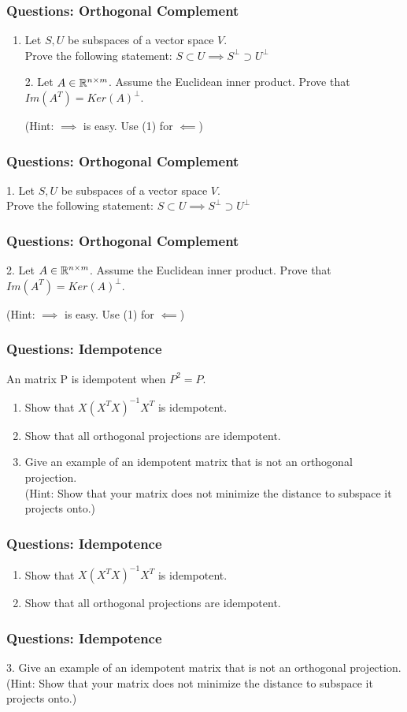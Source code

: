 \documentclass{beamer}
\begin{document}
\begin{frame}[t]
\frametitle{Questions: Orthogonal Complement}
\begin{enumerate}
\item Let $S, U$ be subspaces of a vector space $V$.\\
Prove the following statement:
$S\subset U \implies S^\perp \supset U^\perp$
\bigskip
\item[2.] Let $A\in\mathbb{R}^{n\times m}$.
Assume the Euclidean inner product. Prove that $Im(A^T) = Ker(A)^\perp$.

(Hint: $\implies$ is easy. Use (1) for $\impliedby$)
\end{enumerate}
\end{frame}

\begin{frame}[t]
\frametitle{Questions: Orthogonal Complement}
1. Let $S, U$ be subspaces of a vector space $V$.\\
Prove the following statement:
$S\subset U \implies S^\perp \supset U^\perp$
\end{frame}

\begin{frame}[t]
\frametitle{Questions: Orthogonal Complement}
2. Let $A\in\mathbb{R}^{n\times m}$.
Assume the Euclidean inner product. Prove that $Im(A^T) = Ker(A)^\perp$.

(Hint: $\implies$ is easy. Use (1) for $\impliedby$)
\pause
\end{frame}

\begin{frame}[t]
\frametitle{Questions: Idempotence}
\begin{definition}[Idempotence]
An matrix P is idempotent when $P^2=P$.
\end{definition}
\bigskip
\begin{enumerate}
\item Show that $X(X^TX)^{-1}X^T$ is idempotent.
\item Show that all orthogonal projections are idempotent.
\item Give an example of an idempotent matrix that is not an orthogonal projection.  \\
(Hint: Show that your matrix does not minimize the distance to subspace it projects onto.)
\end{enumerate}
\end{frame}

\begin{frame}[t]
\frametitle{Questions: Idempotence}
\begin{enumerate}
\item Show that $X(X^TX)^{-1}X^T$ is idempotent.
\item Show that all orthogonal projections are idempotent.
\pause
\end{enumerate}
\end{frame}

\begin{frame}[t]
\frametitle{Questions: Idempotence}
3. Give an example of an idempotent matrix that is not an orthogonal projection.  \\
(Hint: Show that your matrix does not minimize the distance to subspace it projects onto.)
\pause
\end{frame}
\end{document}
